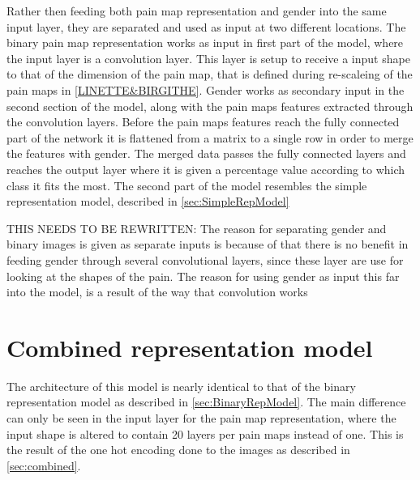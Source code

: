 \noindent
Rather then feeding both pain map representation and gender into the same input layer, they are separated and used as input at two different locations.
The binary pain map representation works as input in first part of the model, where the input layer is a convolution layer.
This layer is setup to receive a input shape to that of the dimension of the pain map, that is defined during re-scaleing of the pain maps in \ref{LINETTE&BIRGITHE}.
Gender works as secondary input in the second section of the model, along with the pain maps features extracted through the convolution layers. Before the pain maps features reach the fully connected part of the network it is flattened from a matrix to a single row in order to merge the features with gender.
The merged data passes the fully connected layers and reaches the output layer where it is given a percentage value according to which class it fits the most.
The second part of the model resembles the simple representation model, described in \ref{sec:SimpleRepModel}

\noindent
THIS NEEDS TO BE REWRITTEN: The reason for separating gender and binary images is given as separate inputs is because of that there is no benefit in feeding gender through several convolutional layers, since these layer are use for looking at the shapes of the pain. 
\noindent
The reason for using gender as input this far into the model, is a result of the way that convolution works

\section{Combined representation model}\label{sec:CombinedRepModel}
The architecture of this model is nearly identical to that of the binary representation model as described in \ref{sec:BinaryRepModel}.
The main difference can only be seen in the input layer for the pain map representation, where the input shape is altered to contain 20 layers per pain maps instead of one.
This is the result of the one hot encoding done to the images as described in \autoref{sec:combined}.